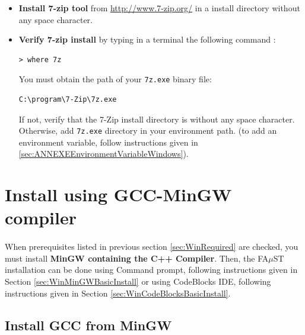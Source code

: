 \begin{itemize}
\item \textbf{Install 7-zip tool} from \url{http://www.7-zip.org/} in a install directory without any space character. 
\item \textbf{Verify 7-zip install} by typing in a terminal the following command : 
\begin{lstlisting}
> where 7z
\end{lstlisting}
You must obtain the path of your \texttt{7z.exe} binary file: 
\begin{lstlisting}[backgroundcolor=\color{white}]
C:\program\7-Zip\7z.exe
\end{lstlisting}
If not, verify that the 7-Zip install directory is without any space character. Otherwise, add \texttt{7z.exe} directory in your environment path. 
(to add an environment variable, follow instructions given in \ref{sec:ANNEXEEnvironmentVariableWindows}). 

\end{itemize}


\section{Install using GCC-MinGW compiler}\label{sec:WinInstallMinGW}

\paragraph{}When prerequisites listed in previous section \ref{sec:WinRequired} are checked, you must install \textbf{MinGW containing the C++ Compiler}. 
Then, the FA$\mu$ST installation can be done using Command prompt, following instructions given in Section \ref{sec:WinMinGWBasicInstall} or using CodeBlocks IDE, following instructions given in Section \ref{sec:WinCodeBlocksBasicInstall}. 


\subsection{Install GCC from MinGW}
\label{sec:WinInstallCompilerMinGW}

